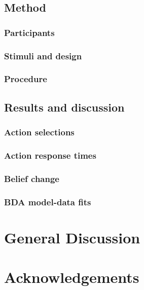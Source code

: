 \documentclass[10pt, letterpaper]{article}
\begin{document}
\subsection{Method}\label{method-1}

\subsubsection{Participants}\label{participants-1}

\subsubsection{Stimuli and design}\label{stimuli-and-design-1}

\subsubsection{Procedure}\label{procedure-1}

\subsection{Results and discussion}\label{results-and-discussion-1}

\subsubsection{Action selections}\label{action-selections-1}

\subsubsection{Action response times}\label{action-response-times-1}

\subsubsection{Belief change}\label{belief-change-1}

\subsubsection{BDA model-data fits}\label{bda-model-data-fits-1}

\section{General Discussion}\label{general-discussion}

\section{Acknowledgements}\label{acknowledgements}
\end{document}
